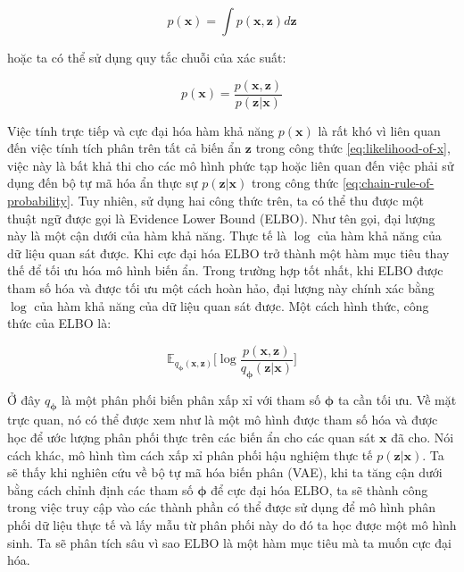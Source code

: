 \documentclass[14pt, a4paper]{article}
\numberwithin{equation}{section}
\numberwithin{figure}{section}
\numberwithin{dl}{section}
\numberwithin{md}{section}
\numberwithin{bd}{section}
\numberwithin{dn}{section}
\numberwithin{hq}{section}
\begin{document}
    \begin{equation} \label{eq:likelihood-of-x}
        p(\boldsymbol{x}) = \int p(\boldsymbol{x}, \boldsymbol{z}) d \boldsymbol{z}
    \end{equation}

    hoặc ta có thể sử dụng quy tắc chuỗi của xác suất:

    \begin{equation} \label{eq:chain-rule-of-probability}
        p(\boldsymbol{x}) = \dfrac{p(\boldsymbol{x}, \boldsymbol{z})}{p(\boldsymbol{z} \vert \boldsymbol{x})}
    \end{equation}

    Việc tính trực tiếp và cực đại hóa hàm khả năng $p(\boldsymbol{x})$ là rất khó vì liên quan đến việc tính tích phân trên tất cả biến ẩn $\boldsymbol{z}$ trong công thức \ref{eq:likelihood-of-x}, việc này là bất khả thi cho các mô hình phức tạp hoặc liên quan đến việc phải sử dụng đến bộ tự mã hóa ẩn thực sự $p(\boldsymbol{z} \vert \boldsymbol{x})$ trong công thức \ref{eq:chain-rule-of-probability}.
    Tuy nhiên, sử dụng hai công thức trên, ta có thể thu được một thuật ngữ được gọi là Evidence Lower Bound (ELBO).
    Như tên gọi, đại lượng này là một cận dưới của hàm khả năng.
    Thực tế là $\log$ của hàm khả năng của dữ liệu quan sát được.
    Khi cực đại hóa ELBO trở thành một hàm mục tiêu thay thế để tối ưu hóa mô hình biến ẩn.
    Trong trường hợp tốt nhất, khi ELBO được tham số hóa và được tối ưu một cách hoàn hảo, đại lượng này chính xác bằng $\log$ của hàm khả năng của dữ liệu quan sát được.
    Một cách hình thức, công thức của ELBO là:

    \begin{equation}
        \mathbb{E}_{q_{\boldsymbol{\phi}}(\boldsymbol{x}, \boldsymbol{z})}  \Bigg \lbrack \log \dfrac{p(\boldsymbol{x}, \boldsymbol{z})}{q_{\boldsymbol{\phi}} (\boldsymbol{z} \vert \boldsymbol{x})} \Bigg \rbrack
    \end{equation}

    Ở đây $q_{\boldsymbol{\phi}}$ là một phân phối biến phân xấp xỉ với tham số $\boldsymbol{\phi}$ ta cần tối ưu.
    Về mặt trực quan, nó có thể được xem như là một mô hình được tham số hóa và được học để ước lượng phân phối thực trên các biến ẩn cho các quan sát $\boldsymbol{x}$ đã cho.
    Nói cách khác, mô hình tìm cách xấp xỉ phân phối hậu nghiệm thực tế $p(\boldsymbol{z} \vert \boldsymbol{x})$.
    Ta sẽ thấy khi nghiên cứu về bộ tự mã hóa biến phân (VAE), khi ta tăng cận dưới bằng cách chỉnh định các tham số $\boldsymbol{\phi}$ để cực đại hóa ELBO, ta sẽ thành công trong việc truy cập vào các thành phần có thể được sử dụng để mô hình phân phối dữ liệu thực tế và lấy mẫu từ phân phối này do đó ta học được một mô hình sinh.
    Ta sẽ phân tích sâu vì sao ELBO là một hàm mục tiêu mà ta muốn cực đại hóa.
\end{document}
